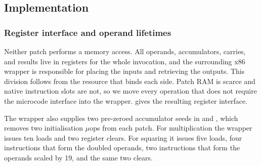 %
%

\subsection{Implementation}

\subsubsection{Register interface and operand lifetimes}
\label{sec:c25519-interface}

Neither patch performs a memory access.
All operands, accumulators, carries, and results live in registers for the whole
invocation, and the surrounding x86 wrapper is responsible for placing the inputs
and retrieving the outputs.
This division follows from the resource that binds each side.
Patch RAM is scarce and native instruction slots are not, so we move every
operation that does not require the microcode interface into the wrapper.
 gives the resulting register interface.

The wrapper also supplies two pre-zeroed accumulator seeds in  and
, which removes two initialisation $\mu$ops from each patch.
For multiplication the wrapper issues ten loads and two register clears.
For squaring it issues five loads, four  instructions that form the
doubled operands, two  instructions that form the operands scaled by
19, and the same two clears.

